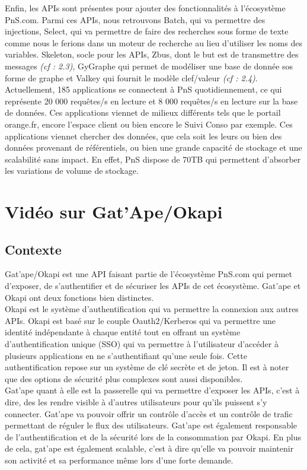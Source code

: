 Enfin, les APIs sont présentes pour ajouter des fonctionnalités à l'écosystème PnS.com. Parmi ces APIs, nous retrouvons Batch, qui va permettre des injections, Select, qui va permettre de faire des recherches sous forme de texte comme nous le ferions dans un moteur de recherche au lieu d'utiliser les noms des variables. Skeleton, socle pour les APIs, Zbus, dont le but est de transmettre des messages \textit{(cf : 2.3)}, GyGraphe qui permet de modéliser une base de donnée sos forme de graphe et Valkey qui fournit le modèle clef/valeur \textit{(cf : 2.4)}.\\

Actuellement, 185 applications se connectent à PnS quotidiennement, ce qui représente 20 000 requêtes/s en lecture et 8 000 requêtes/s en lecture sur la base de données. Ces applications viennet de milieux différents tels que le portail orange.fr, encore l'espace client ou bien encore le Suivi Conso par exemple. Ces applications viennet chercher des données, que cela soit les leurs ou bien des données provenant de référentiels, ou bien une grande capacité de stockage et une scalabilité sans impact. En effet, PnS dispose de 70TB qui permettent d'absorber les variations de volume de stockage.

\section{Vidéo sur Gat'Ape/Okapi}

\subsection{Contexte}
Gat'ape/Okapi est une API faisant partie de l'écosystème PnS.com qui permet d'exposer, de s'authentifier et de sécuriser les APIs de cet écosystème. Gat'ape et Okapi ont deux fonctions bien distinctes.\\

Okapi est le système d'authentification qui va permettre la connexion aux autres APIs. Okapi est basé sur le couple Oauth2/Kerberos qui va permettre une identité indépendante à chaque entité tout en offrant un système d'authentification unique (SSO) qui va permettre à l'utilisateur d'accéder à plusieurs applications en ne s'authentifiant qu'une seule fois. Cette authentification repose sur un système de clé secrète et de jeton. Il est à noter que des options de sécurité plus complexes sont aussi disponibles.\\

Gat'ape quant à elle est la passerelle qui va permettre d'exposer les APIs, c'est à dire, des les rendre visible à d'autres utilisateurs pour qu'ils puissent s'y connecter. Gat'ape va pouvoir offrir un contrôle d'accès et un contrôle de trafic permettant de réguler le flux des utilisateurs. Gat'ape est également responsable  de l'authentification et de la sécurité lors de la consommation par Okapi. En plus de cela, gat'ape est également scalable, c'est à dire qu'elle va pouvoir maintenir son activité et sa performance même lors d'une forte demande.\\

